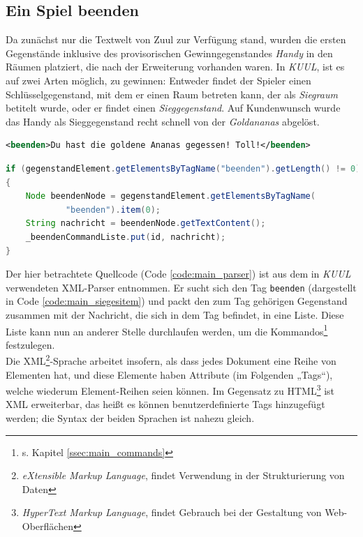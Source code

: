 \documentclass[12pt,twoside]{article}
\theoremstyle{plain}
\theoremstyle{definition}
\theoremstyle{remark}
\begin{document}
\subsection{Ein Spiel beenden}
\label{ssec:main_dev}
Da zunächst nur die Textwelt von Zuul zur Verfügung stand, wurden die ersten Gegenstände inklusive des provisorischen Gewinngegenstandes \textit{Handy} in den Räumen platziert, die nach der Erweiterung vorhanden waren.
In \textit{KUUL}, ist es auf zwei Arten möglich, zu gewinnen: Entweder findet der Spieler einen Schlüsselgegenstand, mit dem er einen Raum betreten kann, der als \textit{Siegraum} betitelt wurde, oder er findet einen \textit{Sieggegenstand}.
Auf Kundenwunsch wurde das Handy als Sieggegenstand recht schnell von der \textit{Goldananas} abgelöst.
\begin{lstlisting}[caption=XML-Tag für den Sieggegenstand, label=code:main_siegesitem, language=XML]
<beenden>Du hast die goldene Ananas gegessen! Toll!</beenden>
\end{lstlisting}
\begin{lstlisting}[caption=Entsprechender Auszug aus dem XML-Parser für Gegenstände, label={code:main_parser}, language=Java]
if (gegenstandElement.getElementsByTagName("beenden").getLength() != 0)
{
	Node beendenNode = gegenstandElement.getElementsByTagName(
			"beenden").item(0);
	String nachricht = beendenNode.getTextContent();
	_beendenCommandListe.put(id, nachricht);
}
\end{lstlisting}
Der hier betrachtete Quellcode (Code \ref{code:main_parser}) ist aus dem in \textit{KUUL} verwendeten XML-Parser entnommen.
Er sucht sich den Tag \texttt{beenden} (dargestellt in Code \ref{code:main_siegesitem}) und packt den zum Tag gehörigen Gegenstand zusammen mit der Nachricht, die sich in dem Tag befindet, in eine Liste. Diese Liste kann nun an anderer Stelle durchlaufen werden, um die Kommandos\footnote{s. Kapitel \ref{ssec:main_commands}} festzulegen.\\
Die XML\footnote{\textit{eXtensible Markup Language}, findet Verwendung in der Strukturierung von Daten}-Sprache arbeitet insofern, als dass jedes Dokument eine Reihe von Elementen hat, und diese Elemente haben Attribute (im Folgenden „Tags“), welche wiederum Element-Reihen seien können.
Im Gegensatz zu HTML\footnote{\textit{HyperText Markup Language}, findet Gebrauch bei der Gestaltung von Web-Oberflächen} ist XML erweiterbar, das heißt es können benutzerdefinierte Tags hinzugefügt werden; die Syntax der beiden Sprachen ist nahezu gleich.\\
\end{document}
